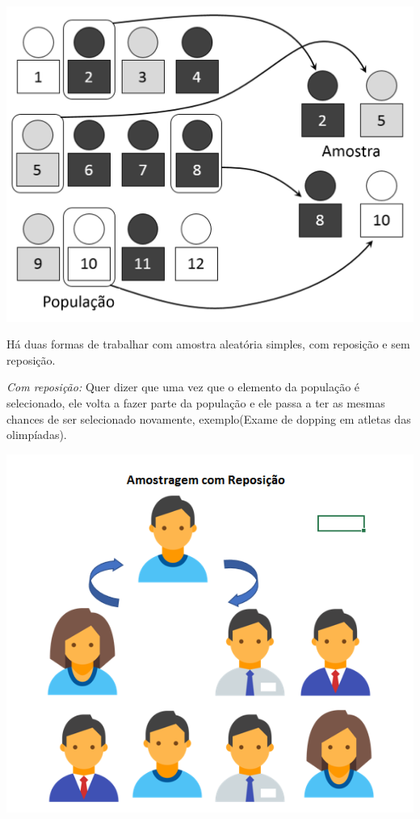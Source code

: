{\centering \includegraphics[scale=0.17]{cap1/Amostragem/AleatoriaSimples.png} \par}

Há duas formas de trabalhar com amostra aleatória simples, com reposição e sem reposição. 

\textit{Com reposição:}
Quer dizer que uma vez que o elemento da população é selecionado, ele volta a fazer parte da população 
e ele passa a ter as mesmas chances de ser selecionado novamente, exemplo(Exame de dopping em atletas das olimpíadas). 

{\centering \includegraphics[scale=0.45]{cap1/Amostragem/amostragemComReposicao.png} \par}

